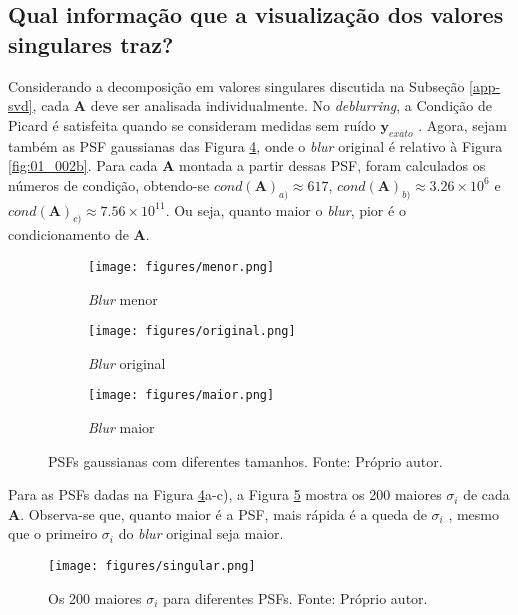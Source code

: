 \subsection{Qual informação que a visualização dos valores singulares   traz?}

Considerando a decomposição em valores singulares discutida na Subseção \ref{app-svd}, cada $\mathbf{A}$ deve ser analisada individualmente. No \textit{deblurring}, a Condição de Picard é satisfeita quando se consideram medidas sem ruído $\mathbf{y}_{exato}$ \cite[pág. 69]{hansen2006deblurring}. Agora, sejam também as PSF gaussianas das Figura \ref{fig:01_008}, onde o \textit{blur} original é relativo à Figura \ref{fig:01_002b}. Para cada $\mathbf{A}$ montada a partir dessas PSF, foram calculados os números de condição, obtendo-se $cond(\mathbf{A})_{a)} \approx 617$,  $cond(\mathbf{A})_{b)} \approx 3.26 \times 10^6$ e $cond(\mathbf{A})_{c)} \approx 7.56 \times 10^{11}$. Ou seja, quanto maior o \textit{blur}, pior é o condicionamento de $\mathbf{A}$.



\begin{figure}[H]
     \centering
     \begin{subfigure}[b]{0.3\textwidth}
         \centering
         \texttt{[image: figures/menor.png]}
         \caption{\textit{Blur} menor}
         \label{fig:01_008a}
     \end{subfigure}
     \hfill
     \begin{subfigure}[b]{0.3\textwidth}
         \centering
                  \texttt{[image: figures/original.png]}
         \caption{\textit{Blur} original}
         \label{fig:01_008b}
     \end{subfigure}
     \hfill
          \begin{subfigure}[b]{0.3\textwidth}
         \centering
                  \texttt{[image: figures/maior.png]}
         \caption{\textit{Blur} maior}
         \label{fig:01_008c}
     \end{subfigure}
\caption[PSFs gaussianas com diferentes tamanhos.]{PSFs gaussianas com diferentes tamanhos. Fonte: Próprio autor.}
\label{fig:01_008}

\end{figure}


Para as PSFs dadas na Figura \ref{fig:01_008}a-c), a Figura \ref{fig:01_009} mostra os 200 maiores $\sigma_i$ de cada $\mathbf{A}$. Observa-se que, quanto maior é a PSF, mais rápida é a queda de $\sigma_i$ \cite[págs. 58-9]{hansen2006deblurring}, mesmo que o primeiro $\sigma_i$ do \textit{blur} original seja maior. 
\begin{figure}[H]
\centering
\texttt{[image: figures/singular.png]} 
\caption[Os 200 maiores $\sigma_i$ para diferentes PSFs.]{Os 200 maiores $\sigma_i$ para diferentes PSFs. Fonte: Próprio autor.}
\label{fig:01_009}
\end{figure}


